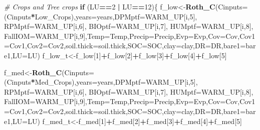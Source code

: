 \documentclass[
  10pt,
  b5paper,
]{book}
\newenvironment{Shaded}{\begin{snugshade}}{\end{snugshade}}
\newcommand{\CommentTok}[1]{\textcolor[rgb]{0.56,0.35,0.01}{\textit{#1}}}
\newcommand{\ControlFlowTok}[1]{\textcolor[rgb]{0.13,0.29,0.53}{\textbf{#1}}}
\newcommand{\DataTypeTok}[1]{\textcolor[rgb]{0.13,0.29,0.53}{#1}}
\newcommand{\DecValTok}[1]{\textcolor[rgb]{0.00,0.00,0.81}{#1}}
\newcommand{\KeywordTok}[1]{\textcolor[rgb]{0.13,0.29,0.53}{\textbf{#1}}}
\newcommand{\NormalTok}[1]{#1}
\newcommand{\OperatorTok}[1]{\textcolor[rgb]{0.81,0.36,0.00}{\textbf{#1}}}
\newcommand{\StringTok}[1]{\textcolor[rgb]{0.31,0.60,0.02}{#1}}
\begin{document}
\begin{Shaded}
\begin{Highlighting}[]
\CommentTok{# Crops and Tree crops}
\ControlFlowTok{if}\NormalTok{ (LU}\OperatorTok{==}\DecValTok{2} \OperatorTok{|}\StringTok{ }\NormalTok{LU}\OperatorTok{==}\DecValTok{12}\NormalTok{)\{}
\NormalTok{f_low<-}\KeywordTok{Roth_C}\NormalTok{(}\DataTypeTok{Cinputs=}\NormalTok{(Cinputs}\OperatorTok{*}\NormalTok{Low_Crops),}\DataTypeTok{years=}\NormalTok{years,}\DataTypeTok{DPMptf=}\NormalTok{WARM_UP[i,}\DecValTok{5}\NormalTok{], }\DataTypeTok{RPMptf=}\NormalTok{WARM_UP[i,}\DecValTok{6}\NormalTok{], }\DataTypeTok{BIOptf=}\NormalTok{WARM_UP[i,}\DecValTok{7}\NormalTok{], }\DataTypeTok{HUMptf=}\NormalTok{WARM_UP[i,}\DecValTok{8}\NormalTok{], }\DataTypeTok{FallIOM=}\NormalTok{WARM_UP[i,}\DecValTok{9}\NormalTok{],}\DataTypeTok{Temp=}\NormalTok{Temp,}\DataTypeTok{Precip=}\NormalTok{Precip,}\DataTypeTok{Evp=}\NormalTok{Evp,}\DataTypeTok{Cov=}\NormalTok{Cov,}\DataTypeTok{Cov1=}\NormalTok{Cov1,}\DataTypeTok{Cov2=}\NormalTok{Cov2,}\DataTypeTok{soil.thick=}\NormalTok{soil.thick,}\DataTypeTok{SOC=}\NormalTok{SOC,}\DataTypeTok{clay=}\NormalTok{clay,}\DataTypeTok{DR=}\NormalTok{DR,}\DataTypeTok{bare1=}\NormalTok{bare1,}\DataTypeTok{LU=}\NormalTok{LU)}
\NormalTok{f_low_t<-f_low[}\DecValTok{1}\NormalTok{]}\OperatorTok{+}\NormalTok{f_low[}\DecValTok{2}\NormalTok{]}\OperatorTok{+}\NormalTok{f_low[}\DecValTok{3}\NormalTok{]}\OperatorTok{+}\NormalTok{f_low[}\DecValTok{4}\NormalTok{]}\OperatorTok{+}\NormalTok{f_low[}\DecValTok{5}\NormalTok{]}

\NormalTok{f_med<-}\KeywordTok{Roth_C}\NormalTok{(}\DataTypeTok{Cinputs=}\NormalTok{(Cinputs}\OperatorTok{*}\NormalTok{Med_Crops),}\DataTypeTok{years=}\NormalTok{years,}\DataTypeTok{DPMptf=}\NormalTok{WARM_UP[i,}\DecValTok{5}\NormalTok{], }\DataTypeTok{RPMptf=}\NormalTok{WARM_UP[i,}\DecValTok{6}\NormalTok{], }\DataTypeTok{BIOptf=}\NormalTok{WARM_UP[i,}\DecValTok{7}\NormalTok{], }\DataTypeTok{HUMptf=}\NormalTok{WARM_UP[i,}\DecValTok{8}\NormalTok{], }\DataTypeTok{FallIOM=}\NormalTok{WARM_UP[i,}\DecValTok{9}\NormalTok{],}\DataTypeTok{Temp=}\NormalTok{Temp,}\DataTypeTok{Precip=}\NormalTok{Precip,}\DataTypeTok{Evp=}\NormalTok{Evp,}\DataTypeTok{Cov=}\NormalTok{Cov,}\DataTypeTok{Cov1=}\NormalTok{Cov1,}\DataTypeTok{Cov2=}\NormalTok{Cov2,}\DataTypeTok{soil.thick=}\NormalTok{soil.thick,}\DataTypeTok{SOC=}\NormalTok{SOC,}\DataTypeTok{clay=}\NormalTok{clay,}\DataTypeTok{DR=}\NormalTok{DR,}\DataTypeTok{bare1=}\NormalTok{bare1,}\DataTypeTok{LU=}\NormalTok{LU)}
\NormalTok{f_med_t<-f_med[}\DecValTok{1}\NormalTok{]}\OperatorTok{+}\NormalTok{f_med[}\DecValTok{2}\NormalTok{]}\OperatorTok{+}\NormalTok{f_med[}\DecValTok{3}\NormalTok{]}\OperatorTok{+}\NormalTok{f_med[}\DecValTok{4}\NormalTok{]}\OperatorTok{+}\NormalTok{f_med[}\DecValTok{5}\NormalTok{]}


\end{Highlighting}
\end{Shaded}
\end{document}

